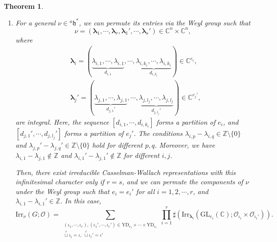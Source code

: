 \documentclass[12pt, a4paper]{amsart}
\numberwithin{equation}{section}
\newtheorem{thm}{Theorem}[section]
\newcommand{\blam}{{\boldsymbol{\lambda}}}
\newcommand{\BC}{{\mathbb {C}}}
\newcommand{\BZ}{{\mathbb {Z}}}
\newcommand{\CO}{{\mathcal {O}}}
\newcommand{\fh}{\mathfrak{h}}
\newcommand{\GL}{{\mathrm{GL}}}
\newcommand{\Irr}{{\mathrm{Irr}}}
\begin{document}
\begin{thm}
\begin{enumerate}
$$        \right.$$
        \item For a general $\nu \in {^{a}\fh^*}$, we can permute its entries via the Weyl group such that
        \[
        \nu = (\blam_1, \cdots, \blam_r, \blam_1', \cdots, \blam_s') \in \BC^n \times \BC^n,
        \]
        where 
        \begin{align}
            &\blam_i = (\underbrace{\lambda_{i,1}, \cdots, \lambda_{i,1}}_{d_{i,1}}, \cdots, \underbrace{\lambda_{i,k_i}, \cdots, \lambda_{i,k_i}}_{d_{i,k_i}}) \in \BC^{e_i},\\
            &\blam_j' = (\underbrace{\lambda_{j,1}, \cdots, \lambda_{j,1}}_{d_{j,1}'}, \cdots, \underbrace{\lambda_{j,l_j}, \cdots, \lambda_{j,l_j}}_{d_{j,l_j}'}) \in \BC^{e_j'},
        \end{align}
        are integral. Here, the sequence $[d_{i,1}, \cdots, d_{i,k_i}]$ forms a partition of $e_i$, and $[d_{j,1}', \cdots, d_{j,l_j}']$ forms a partition of $e_j'$. The conditions $\lambda_{i,p} - \lambda_{i,q} \in \BZ \setminus \{0\}$ and $\lambda_{j,p}' - \lambda_{j,q}' \in \BZ \setminus \{0\}$ hold for different $p,q$. Moreover, we have $\lambda_{i,1} - \lambda_{j,1} \notin \BZ$ and $\lambda_{i,1}' - \lambda_{j,1}' \notin \BZ$ for different $i,j$. 
    
        Then, there exist irreducible Casselman-Wallach representations with this infinitesimal character only if $r = s$, and we can permute the components of $\nu$ under the Weyl group such that $e_i = e_i'$ for all $i = 1, 2, \cdots, r$, and $\lambda_{i,1} - \lambda_{i,1}' \in \BZ$. In this case, 
        \begin{equation}
            \Irr_{\nu}(G;\CO) = \sum_{\substack{(\iota_1,\cdots,\iota_r), (\iota_1',\cdots,\iota_r') \in \mathrm{YD}_{e_1} \times \cdots \times \mathrm{YD}_{e_r}\\ \mathop{\sqcup}\limits^r \iota_i = \iota, \ \mathop{\sqcup}\limits^r \iota_i' = \iota' }} \prod_{i=1}^{r} \sharp(\Irr_{\blam_i}(\GL_{e_i}(\BC);\CO_{\iota_i} \times \CO_{\iota_i'})).
        \end{equation}

    \end{enumerate}


\end{thm}
\end{document}
